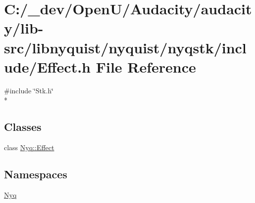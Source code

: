 \hypertarget{lib-src_2libnyquist_2nyquist_2nyqstk_2include_2_effect_8h}{}\section{C\+:/\+\_\+dev/\+Open\+U/\+Audacity/audacity/lib-\/src/libnyquist/nyquist/nyqstk/include/\+Effect.h File Reference}
\label{lib-src_2libnyquist_2nyquist_2nyqstk_2include_2_effect_8h}
{\ttfamily \#include \char`\"{}Stk.\+h\char`\"{}}\\*
\subsection*{Classes}
\begin{DoxyCompactItemize}
\item 
class \hyperlink{class_nyq_1_1_effect}{Nyq\+::\+Effect}
\end{DoxyCompactItemize}
\subsection*{Namespaces}
\begin{DoxyCompactItemize}
\item 
 \hyperlink{namespace_nyq}{Nyq}
\end{DoxyCompactItemize}
